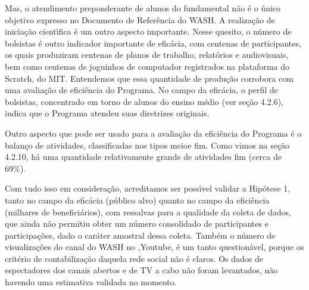 \documentclass[
12pt,		%
openright,	%
twoside,  %
a4paper,			%
chapter=TITLE,		%
english,			%
french,				%
spanish,			%
brazil				%
]{USPSC-classe/USPSC}
\begin{document}
Mas, o atendimento preponderante de alunos do fundamental n\~ao \'e o \'unico objetivo expresso no Documento de Refer\^encia do WASH. A realiza\c{c}\~ao de inicia\c{c}\~ao cient\'{\i}fica \'e um outro aspecto importante. Nesse quesito, o n\'umero de bolsistas \'e outro indicador importante de efic\'acia, com centenas de participantes, os quais produziram centenas de planos de trabalho, relat\'orios e audiovisuais, bem como centenas de joguinhos de computador registrados na plataforma do Scratch, do MIT. Entendemos que essa quantidade de produ\c{c}\~ao corrobora com uma avalia\c{c}\~ao de efici\^encia do Programa. No campo da efic\'acia, o perfil de bolsistas, concentrado em torno de alunos do ensino m\'edio (ver se\c{c}\~ao 4.2.6), indica que o Programa atendeu suas diretrizes originais.









Outro aspecto que pode ser usado para a avalia\c{c}\~ao da efici\^encia do Programa \'e o balan\c{c}o de atividades, classificadas nos tipos \textquotedbl meio\textquotedbl  e \textquotedbl fim\textquotedbl . Como vimos na se\c{c}\~ao 4.2.10, h\'a uma quantidade relativamente grande de atividades fim (cerca de 69\%).









Com tudo isso em considera\c{c}\~ao, acreditamos ser poss\'{\i}vel validar a Hip\'otese 1, tanto no campo da efic\'acia (p\'ublico alvo) quanto no campo da efici\^encia (milhares de benefici\'arios), com ressalvas para a qualidade da coleta de dados, que ainda n\~ao permitiu obter um n\'umero consolidado de participantes e participa\c{c}\~oes, dado o car\'ater amostral dessa coleta. Tamb\'em o n\'umero de visualiza\c{c}\~oes do canal do WASH no ,Youtube, \'e um tanto question\'avel, porque os crit\'erio de contabiliza\c{c}\~ao daquela rede social n\~ao \'e claros. Os dados de espectadores dos canais abertos e de TV a cabo n\~ao foram levantados, n\~ao havendo uma estimativa validada no momento.
\end{document}
